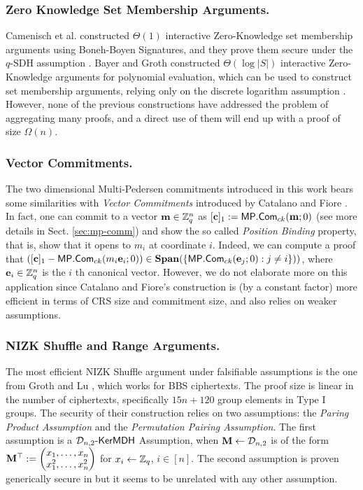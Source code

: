 \subsubsection{Zero Knowledge Set Membership Arguments.}
Camenisch et al. constructed $\Theta(1)$ interactive Zero-Knowledge set membership arguments using Boneh-Boyen Signatures, and they prove them secure under the $q$-SDH assumption \cite{AC:CamChaShe08}. Bayer and Groth constructed $\Theta(\log |S|)$ interactive Zero-Knowledge arguments for polynomial evaluation, which can be used to construct set membership arguments, relying only on the discrete logarithm assumption \cite{EC:BayGro13}.
However, none of the previous constructions have addressed the problem of aggregating many proofs, and a direct use of them will end up with a proof of size $\Omega(n)$.

\iffull
\subsubsection{Vector Commitments.}
The two dimensional Multi-Pedersen commitments introduced in this work bears some similarities with \emph{Vector Commitments} introduced by Catalano and Fiore \cite{PKC:CatFio13}. In fact, one can commit to a vector $\mathbf{m}\in\mathbb{Z}_q^n$ as $[\mathbf{c}]_1:=\mathsf{MP}.\mathsf{Com}_{ck}(\mathbf{m};0)$ (see more details in Sect. \ref{sec:mp-comm}) and show the so called \emph{Position Binding} property, that is, show that it opens to $m_i$ at coordinate $i$. Indeed, we can compute a proof that $([\mathbf{c}]_1-\mathsf{MP}.\mathsf{Com}_{ck}(m_i\mathbf{e}_i;0))\in\mathbf{Span}(\{\mathsf{MP}.\mathsf{Com}_{ck}(\mathbf{e}_j;0):j\neq i\}))$, where $\mathbf{e}_i\in\mathbb{Z}_q^n$ is the $i$ th canonical vector. However, we do not elaborate more on this application since Catalano and Fiore's construction is (by a constant factor) more efficient in terms of CRS size and commitment size, and also relies on weaker assumptions.
\fi

\subsubsection{NIZK Shuffle and Range Arguments.}
The most efficient NIZK Shuffle argument under falsifiable assumptions is the one from Groth and Lu \cite{AC:GroLu07}, which works for BBS ciphertexts. The proof size is linear in the number of ciphertexts, specifically $15n + 120$ group elements in Type I groups. The security of their construction relies on two assumptions: the \emph{Paring Product Assumption} and the \emph{Permutation Pairing Assumption}. The first assumption is a $\mathcal{D}_{n,2}\mbox{-}\mathsf{KerMDH}$ Assumption, when $\mathbf{{M}}\gets\mathcal{D}_{n,2}$ is of the form $\mathbf{{M}}^\top:=\left(\begin{matrix}x_1,\ldots,x_n\\x_1^2,\ldots,x_n^2\end{matrix}\right)$ for $x_i\gets\mathbb{Z}_q$, $i\in[n]$. The second assumption is proven generically secure in \cite{AC:GroLu07} but it seems to be unrelated with any other assumption.


